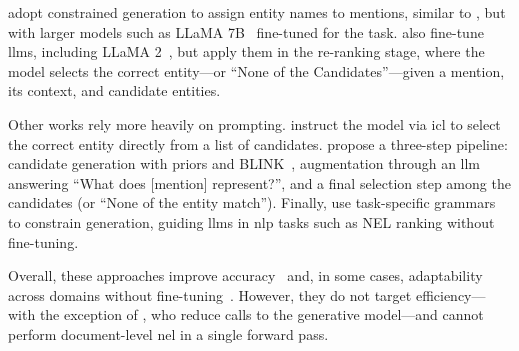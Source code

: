 \textcite{xiao-etal-2023-instructed} adopt constrained generation to assign entity names to mentions, similar to \cite{decao2021autoregressive}, but with larger models such as LLaMA 7B~\cite{touvron2023llamaopenefficientfoundation} fine-tuned for the task. \textcite{zhou-etal-2024-gendecider} also fine-tune \acp{llm}, including LLaMA 2~\cite{touvron2023llama2openfoundation}, but apply them in the re-ranking stage, where the model selects the correct entity---or ``None of the Candidates''---given a mention, its context, and candidate entities.

Other works rely more heavily on prompting. \textcite{liu-etal-2024-onenet} instruct the model via \ac{icl} to select the correct entity directly from a list of candidates. \textcite{ding-etal-2024-chatel} propose a three-step pipeline: candidate generation with priors and BLINK~\cite{blink}, augmentation through an \ac{llm} answering ``What does [mention] represent?'', and a final selection step among the candidates (or ``None of the entity match''). Finally, \textcite{geng-etal-2023-grammar} use task-specific grammars to constrain generation, guiding \acp{llm} in \ac{nlp} tasks such as NEL ranking without fine-tuning.

Overall, these approaches improve accuracy~\cite{liu-etal-2024-onenet,ding-etal-2024-chatel,zhou-etal-2024-gendecider,xiao-etal-2023-instructed} and, in some cases, adaptability across domains without fine-tuning~\cite{ding-etal-2024-chatel,zhou-etal-2024-gendecider,xiao-etal-2023-instructed}. However, they do not target efficiency---with the exception of \textcite{xiao-etal-2023-instructed}, who reduce calls to the generative model---and cannot perform document-level \ac{nel} in a single forward pass.












